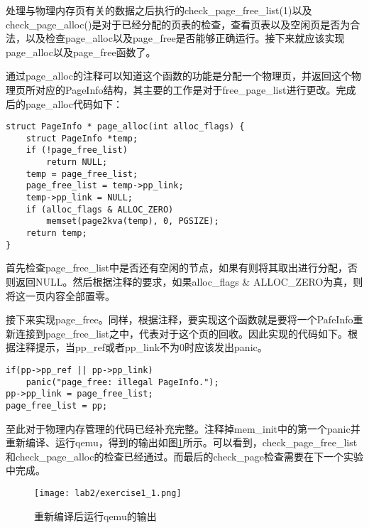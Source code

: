 \begin{exerciseSolution}{1}
    \par 处理与物理内存页有关的数据之后执行的check\_page\_free\_list(1)以及check\_page\_alloc()是对于已经分配的页表的检查，查看页表以及空闲页是否为合法，以及检查page\_alloc以及page\_free是否能够正确运行。接下来就应该实现page\_alloc以及page\_free函数了。
    \par 通过page\_alloc的注释可以知道这个函数的功能是分配一个物理页，并返回这个物理页所对应的PageInfo结构，其主要的工作是对于free\_page\_list进行更改。完成后的page\_alloc代码如下：
    \begin{lstlisting}
struct PageInfo * page_alloc(int alloc_flags) {
    struct PageInfo *temp;
    if (!page_free_list)
        return NULL;
    temp = page_free_list;
    page_free_list = temp->pp_link;
    temp->pp_link = NULL;
    if (alloc_flags & ALLOC_ZERO)
        memset(page2kva(temp), 0, PGSIZE);
    return temp;
}
    \end{lstlisting}
    \par 首先检查page\_free\_list中是否还有空闲的节点，如果有则将其取出进行分配，否则返回NULL。然后根据注释的要求，如果alloc\_flags \& ALLOC\_ZERO为真，则将这一页内容全部置零。
    \par 接下来实现page\_free。同样，根据注释，要实现这个函数就是要将一个PafeInfo重新连接到page\_free\_list之中，代表对于这个页的回收。因此实现的代码如下。根据注释提示，当pp\_ref或者pp\_link不为0时应该发出panic。
    \begin{lstlisting}
if(pp->pp_ref || pp->pp_link)
    panic("page_free: illegal PageInfo.");
pp->pp_link = page_free_list;
page_free_list = pp;
    \end{lstlisting}
    \par 至此对于物理内存管理的代码已经补充完整。注释掉mem\_init中的第一个panic并重新编译、运行qemu，得到的输出如图\ref{fig:lab2/exercise1_1}所示。可以看到，check\_page\_free\_list和check\_page\_alloc的检查已经通过。而最后的check\_page检查需要在下一个实验中完成。
    \begin{figure}[htb]
        \centering
        \texttt{[image: lab2/exercise1\_1.png]}
        \caption{重新编译后运行qemu的输出}
        \label{fig:lab2/exercise1_1}
    \end{figure}
    \FloatBarrier
\end{exerciseSolution}

